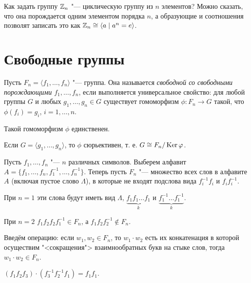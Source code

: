 \documentclass[main]{subfiles}
\begin{document}
Как задать группу $\mathbb{Z}_n$ "--- циклическую группу из
$n$ элементов? Можно сказать, что она порождается одним элементом порядка
$n$, а образующие и соотношения позволят записать это как
$\Integer_n \cong \GenGroup{a}[a^n = e]$.


\section{Свободные группы}
\begin{definition}
  Пусть $F_n = \langle f_1, \dots, f_n \rangle$ "--- группа.
  Она называется \emph{свободной со свободными порождающими
  $f_1, \dots, f_n$}, если выполняется универсальное свойство:
  для любой группы $G$ и любых $g_1, \dots, g_n \in G$ существует
  гомоморфизм $\phi : F_n \to G$ такой, что
  $\phi(f_i) = g_i$, $i = 1, \dots, n$.
\end{definition}

\begin{remark}
  Такой гомоморфизм $\phi$ единственен.
\end{remark}

\begin{remark}
  Если $G = \langle g_1, \dots, g_n \rangle$, то $\phi$ сюрьективен,
  т. е. $G \cong F_n/\operatorname{Ker} \varphi$.
\end{remark}

Пусть $f_1, \dots, f_n$ "--- $n$ различных символов.
Выберем алфавит $A = \{ f_1, \dots, f_n, f_1^{-1}, \dots, f_n^{-1} \}$.
Теперь пусть $F_n$ "--- множество всех слов в алфавите $A$
(включая пустое слово $\Lambda$), в которые не входят
подслова вида $f_i^{-1} f_i$ и $f_i f_i^{-1}$.

\begin{example}
  При $n = 1$ эти слова будут иметь вид $\Lambda$,
  $\underbrace{f_1 f_1 \dots f_1}_k$ и
  $\underbrace{f_1^{-1} \dots f_1^{-1}}_k$.
\end{example}
\begin{example}
  При $n = 2$
  $f_1 f_2 f_2 f_1^{-1} \in F_n$,
  а $f_1 f_2 f_2^{-1} \notin F_n$.
\end{example}

Введём операцию:
если $w_1, w_2 \in F_n$,
то $w_1 \cdot w_2$ есть их конкатенация
в которой осуществим "<сокращения">
взаимнообратных букв на стыке слов,
тогда $w_1 \cdot w_2 \in F_n$.

\begin{example}
  $(f_1 f_2 f_3) \cdot (f_3^{-1} f_2^{-1} f_1) = f_1 f_1$.
\end{example}
\end{document}
